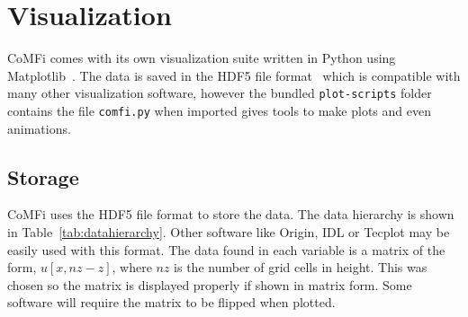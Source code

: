 \documentclass[12pt,upcase]{umlthesis}
\def\code#1{\texttt{#1}}
\begin{document}
\section{Visualization}\label{sec:visualization} 

CoMFi comes with its own visualization suite written in Python using Matplotlib~\citep{Hunter2007}. The data is saved in the HDF5 file format~\citep{hdf5} which is compatible with many other visualization software, however the bundled \code{plot-scripts} folder contains the file \code{comfi.py} when imported gives tools to make plots and even animations.

\subsection{Storage}

CoMFi uses the HDF5 file format to store the data. The data hierarchy is shown in Table~\ref{tab:datahierarchy}. Other software like Origin, IDL or Tecplot may be easily used with this format. The data found in each variable is a matrix of the form, $u[x, {nz}-z]$, where ${nz}$ is the number of grid cells in height. This was chosen so the matrix is displayed properly if shown in matrix form. Some software will require the matrix to be flipped when plotted.
\end{document}

